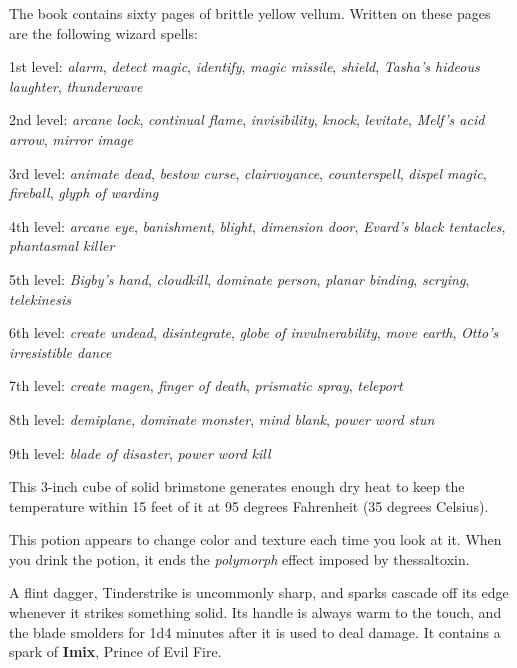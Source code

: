 \documentclass[10pt,a4paper,twoside,bg=print,twocolumn,openany,nodeprecatedcode]{dndbook}
\begin{document}
The book contains sixty pages of brittle yellow vellum. Written on these pages are the following wizard spells:


\begin{description}
\item 1st level: \textit{alarm}, \textit{detect magic}, \textit{identify}, \textit{magic missile}, \textit{shield}, \textit{Tasha's hideous laughter}, \textit{thunderwave}
\item 2nd level: \textit{arcane lock}, \textit{continual flame}, \textit{invisibility}, \textit{knock}, \textit{levitate}, \textit{Melf's acid arrow}, \textit{mirror image}
\item 3rd level: \textit{animate dead}, \textit{bestow curse}, \textit{clairvoyance}, \textit{counterspell}, \textit{dispel magic}, \textit{fireball}, \textit{glyph of warding}
\item 4th level: \textit{arcane eye}, \textit{banishment}, \textit{blight}, \textit{dimension door}, \textit{Evard's black tentacles}, \textit{phantasmal killer}
\item 5th level: \textit{Bigby's hand}, \textit{cloudkill}, \textit{dominate person}, \textit{planar binding}, \textit{scrying}, \textit{telekinesis}
\item 6th level: \textit{create undead}, \textit{disintegrate}, \textit{globe of invulnerability}, \textit{move earth}, \textit{Otto's irresistible dance}
\item 7th level: \textit{create magen}, \textit{finger of death}, \textit{prismatic spray}, \textit{teleport}
\item 8th level: \textit{demiplane}, \textit{dominate monster}, \textit{mind blank}, \textit{power word stun}
\item 9th level: \textit{blade of disaster}, \textit{power word kill}
\end{description}

This 3-inch cube of solid brimstone generates enough dry heat to keep the temperature within 15 feet of it at 95 degrees Fahrenheit (35 degrees Celsius).

This potion appears to change color and texture each time you look at it. When you drink the potion, it ends the \textit{polymorph} effect imposed by thessaltoxin.

A flint dagger, Tinderstrike is uncommonly sharp, and sparks cascade off its edge whenever it strikes something solid. Its handle is always warm to the touch, and the blade smolders for 1d4 minutes after it is used to deal damage. It contains a spark of \textbf{Imix}, Prince of Evil Fire.
\end{document}
